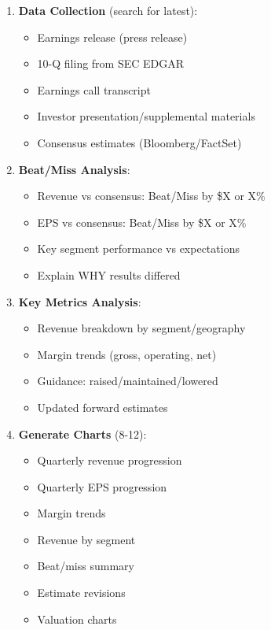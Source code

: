 \documentclass[11pt]{article}
\begin{document}
\begin{enumerate}[leftmargin=*,itemsep=2pt,topsep=2pt]
\item {} \textbf{Data Collection} (search for latest):
\begin{itemize}[leftmargin=*,itemsep=2pt,topsep=2pt]
\item {} Earnings release (press release)
\item {} 10-Q filing from SEC EDGAR
\item {} Earnings call transcript
\item {} Investor presentation/supplemental materials
\item {} Consensus estimates (Bloomberg/FactSet)
\end{itemize}
\item {} \textbf{Beat/Miss Analysis}:
\begin{itemize}[leftmargin=*,itemsep=2pt,topsep=2pt]
\item {} Revenue vs consensus: Beat/Miss by \$X or X\%
\item {} EPS vs consensus: Beat/Miss by \$X or X\%
\item {} Key segment performance vs expectations
\item {} Explain WHY results differed
\end{itemize}
\item {} \textbf{Key Metrics Analysis}:
\begin{itemize}[leftmargin=*,itemsep=2pt,topsep=2pt]
\item {} Revenue breakdown by segment/geography
\item {} Margin trends (gross, operating, net)
\item {} Guidance: raised/maintained/lowered
\item {} Updated forward estimates
\end{itemize}
\item {} \textbf{Generate Charts} (8-12):
\begin{itemize}[leftmargin=*,itemsep=2pt,topsep=2pt]
\item {} Quarterly revenue progression
\item {} Quarterly EPS progression
\item {} Margin trends
\item {} Revenue by segment
\item {} Beat/miss summary
\item {} Estimate revisions
\item {} Valuation charts
\end{itemize}

\end{enumerate}
\end{document}

